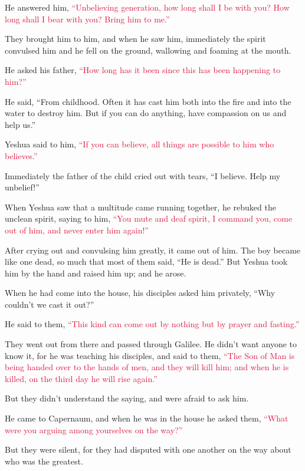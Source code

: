 \myverse{}He answered him,
\textcolor{crimson}{“Unbelieving generation, how long shall I be with you? How long shall I bear with you? Bring him to
	me.”}

\myverse{}They brought him to him, and when he saw him, immediately the
spirit convulsed him and he fell on the ground, wallowing and foaming at the mouth.

\myverse{}He asked his father,
\textcolor{crimson}{“How long has it been since this has been happening to him?”}

He said, “From childhood.
\myverse{}Often it has cast him both into the fire and into the water to destroy him.
But if you can do anything, have compassion on us and help us.”

\myverse{}Yeshua said to him,
\textcolor{crimson}{“If you can believe, all things are possible to him who believes.”}

\myverse{}Immediately the father of the child cried out with tears, “I
believe. Help my unbelief!”

\myverse{}When Yeshua saw that a multitude came running together, he rebuked
the unclean spirit, saying to him,
\textcolor{crimson}{“You mute and deaf spirit, I command you, come out of him, and never enter him again!”}

\myverse{}After crying out and convulsing him greatly, it came out of him.
The boy became like one dead, so much that most of them said, “He is dead.”
\myverse{}But Yeshua took him by the hand and raised him up; and he arose.

\myverse{}When he had come into the house, his disciples asked him privately,
“Why couldn’t we cast it out?”

\myverse{}He said to them,
\textcolor{crimson}{“This kind can come out by nothing but by prayer and fasting.”}

\myverse{}They went out from there and passed through Galilee. He didn’t
want anyone to know it,
\myverse{}for he was teaching his disciples, and said to them,
\textcolor{crimson}{“The Son of Man is being handed over to the hands of men, and they will kill him; and when he is killed,
	on the third day he will rise again.”}

\myverse{}But they didn’t understand the saying, and were afraid to ask
him.

\myverse{}He came to Capernaum, and when he was in the house he asked them,
\textcolor{crimson}{“What were you arguing among yourselves on the way?”}

\myverse{}But they were silent, for they had disputed with one another
on the way about who was the greatest.

